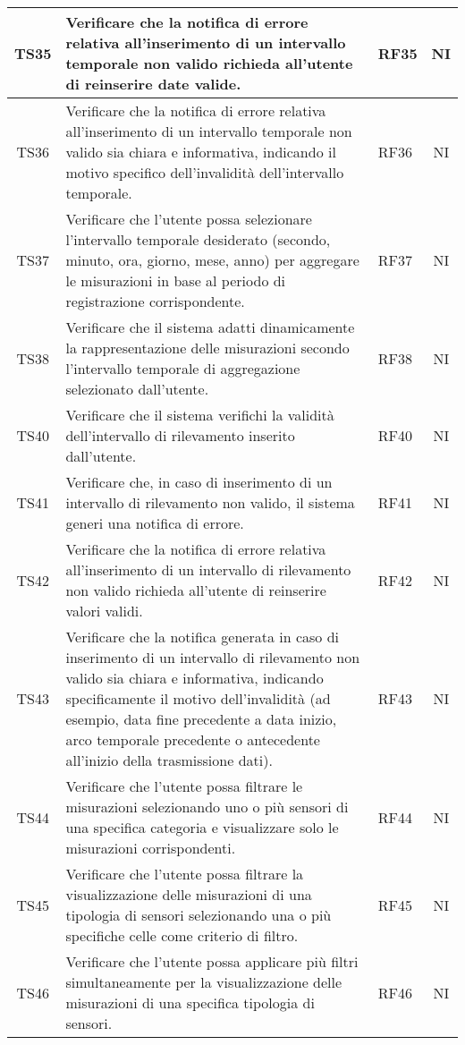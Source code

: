 \begin{longtable}{|c|p{5cm}|>{\raggedright}p{2cm}|c|}
        \hline
        TS35 & Verificare che la notifica di errore relativa all'inserimento di un intervallo temporale non valido richieda all'utente di reinserire date valide. & RF35 & NI \\
        \hline
        TS36 & Verificare che la notifica di errore relativa all'inserimento di un intervallo temporale non valido sia chiara e informativa, indicando il motivo specifico dell'invalidità dell'intervallo temporale. & RF36 & NI \\
        \hline
        TS37 & Verificare che l'utente possa selezionare l'intervallo temporale desiderato (secondo, minuto, ora, giorno, mese, anno) per aggregare le misurazioni in base al periodo di registrazione corrispondente. & RF37 & NI \\
        \hline
        TS38 & Verificare che il sistema adatti dinamicamente la rappresentazione delle misurazioni secondo l'intervallo temporale di aggregazione selezionato dall'utente. & RF38 & NI \\
        \hline
        TS40 & Verificare che il sistema verifichi la validità dell'intervallo di rilevamento inserito dall'utente. & RF40 & NI \\
        \hline
        TS41 & Verificare che, in caso di inserimento di un intervallo di rilevamento non valido, il sistema generi una notifica di errore. & RF41 & NI \\
        \hline
        TS42 & Verificare che la notifica di errore relativa all'inserimento di un intervallo di rilevamento non valido richieda all'utente di reinserire valori validi. & RF42 & NI \\
        \hline
        TS43 & Verificare che la notifica generata in caso di inserimento di un intervallo di rilevamento non valido sia chiara e informativa, indicando specificamente il motivo dell'invalidità (ad esempio, data fine precedente a data inizio, arco temporale precedente o antecedente all’inizio della trasmissione dati). & RF43 & NI \\
        \hline
        TS44 & Verificare che l'utente possa filtrare le misurazioni selezionando uno o più sensori di una specifica categoria e visualizzare solo le misurazioni corrispondenti. & RF44 & NI \\
        \hline
        TS45 & Verificare che l'utente possa filtrare la visualizzazione delle misurazioni di una tipologia di sensori selezionando una o più specifiche celle come criterio di filtro. & RF45 & NI \\
        \hline
        TS46 & Verificare che l'utente possa applicare più filtri simultaneamente per la visualizzazione delle misurazioni di una specifica tipologia di sensori. & RF46 & NI \\

\end{longtable}
